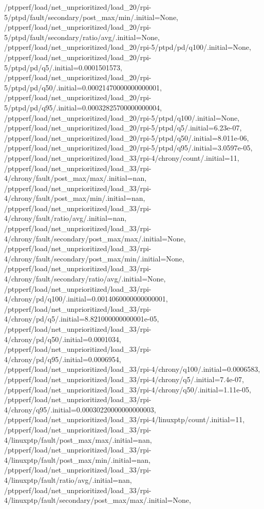 {    /ptpperf/load/net_unprioritized/load_20/rpi-5/ptpd/fault/secondary/post_max/min/.initial=None,
    /ptpperf/load/net_unprioritized/load_20/rpi-5/ptpd/fault/secondary/ratio/avg/.initial=None,
    /ptpperf/load/net_unprioritized/load_20/rpi-5/ptpd/pd/q100/.initial=None,
    /ptpperf/load/net_unprioritized/load_20/rpi-5/ptpd/pd/q5/.initial=0.0001501573,
    /ptpperf/load/net_unprioritized/load_20/rpi-5/ptpd/pd/q50/.initial=0.00021470000000000001,
    /ptpperf/load/net_unprioritized/load_20/rpi-5/ptpd/pd/q95/.initial=0.00032825700000000004,
    /ptpperf/load/net_unprioritized/load_20/rpi-5/ptpd/q100/.initial=None,
    /ptpperf/load/net_unprioritized/load_20/rpi-5/ptpd/q5/.initial=6.23e-07,
    /ptpperf/load/net_unprioritized/load_20/rpi-5/ptpd/q50/.initial=8.011e-06,
    /ptpperf/load/net_unprioritized/load_20/rpi-5/ptpd/q95/.initial=3.0597e-05,
    /ptpperf/load/net_unprioritized/load_33/rpi-4/chrony/count/.initial=11,
    /ptpperf/load/net_unprioritized/load_33/rpi-4/chrony/fault/post_max/max/.initial=nan,
    /ptpperf/load/net_unprioritized/load_33/rpi-4/chrony/fault/post_max/min/.initial=nan,
    /ptpperf/load/net_unprioritized/load_33/rpi-4/chrony/fault/ratio/avg/.initial=nan,
    /ptpperf/load/net_unprioritized/load_33/rpi-4/chrony/fault/secondary/post_max/max/.initial=None,
    /ptpperf/load/net_unprioritized/load_33/rpi-4/chrony/fault/secondary/post_max/min/.initial=None,
    /ptpperf/load/net_unprioritized/load_33/rpi-4/chrony/fault/secondary/ratio/avg/.initial=None,
    /ptpperf/load/net_unprioritized/load_33/rpi-4/chrony/pd/q100/.initial=0.0014060000000000001,
    /ptpperf/load/net_unprioritized/load_33/rpi-4/chrony/pd/q5/.initial=8.821000000000001e-05,
    /ptpperf/load/net_unprioritized/load_33/rpi-4/chrony/pd/q50/.initial=0.0001034,
    /ptpperf/load/net_unprioritized/load_33/rpi-4/chrony/pd/q95/.initial=0.0006954,
    /ptpperf/load/net_unprioritized/load_33/rpi-4/chrony/q100/.initial=0.0006583,
    /ptpperf/load/net_unprioritized/load_33/rpi-4/chrony/q5/.initial=7.4e-07,
    /ptpperf/load/net_unprioritized/load_33/rpi-4/chrony/q50/.initial=1.11e-05,
    /ptpperf/load/net_unprioritized/load_33/rpi-4/chrony/q95/.initial=0.00030220000000000003,
    /ptpperf/load/net_unprioritized/load_33/rpi-4/linuxptp/count/.initial=11,
    /ptpperf/load/net_unprioritized/load_33/rpi-4/linuxptp/fault/post_max/max/.initial=nan,
    /ptpperf/load/net_unprioritized/load_33/rpi-4/linuxptp/fault/post_max/min/.initial=nan,
    /ptpperf/load/net_unprioritized/load_33/rpi-4/linuxptp/fault/ratio/avg/.initial=nan,
    /ptpperf/load/net_unprioritized/load_33/rpi-4/linuxptp/fault/secondary/post_max/max/.initial=None,
}
